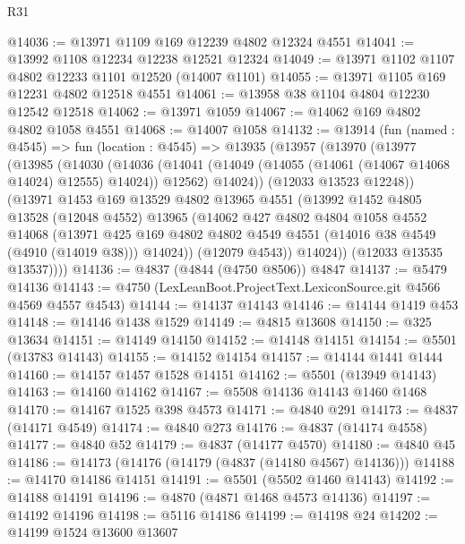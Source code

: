 \begin{lexlean}{R31}
\begin{coremodule}
@14036 := @13971 @1109 @169 @12239 @4802 @12324 @4551
@14041 := @13992 @1108 @12234 @12238 @12521 @12324
@14049 := @13971 @1102 @1107 @4802 @12233 @1101 @12520 (@14007 @1101)
@14055 := @13971 @1105 @169 @12231 @4802 @12518 @4551
@14061 := @13958 @38 @1104 @4804 @12230 @12542 @12518
@14062 := @13971 @1059
@14067 := @14062 @169 @4802 @4802 @1058 @4551
@14068 := @14007 @1058
@14132 := @13914
    (fun (named : @4545) =>
    fun (location : @4545) =>
    @13935
      (@13957
        (@13970
          (@13977
            (@13985
              (@14030
                (@14036
                  (@14041 (@14049 (@14055 (@14061 (@14067 @14068 @14024) @12555) @14024)) @12562)
                  @14024))
              (@12033 @13523 @12248))
            (@13971
              @1453
              @169
              @13529
              @4802
              @13965
              @4551
              (@13992
                @1452
                @4805
                @13528
                (@12048 @4552)
                @13965
                (@14062
                  @427
                  @4802
                  @4804
                  @1058
                  @4552
                  @14068
                  (@13971
                    @425
                    @169
                    @4802
                    @4802
                    @4549
                    @4551
                    (@14016 @38 @4549 (@4910 (@14019 @38)))
                    @14024))
                (@12079 @4543))
              @14024))
          (@12033 @13535 @13537))))
@14136 := @4837 (@4844 (@4750 @8506)) @4847
@14137 := @5479 @14136
@14143 := @4750 (LexLeanBoot.ProjectText.LexiconSource.git @4566 @4569 @4557 @4543)
@14144 := @14137 @14143
@14146 := @14144 @1419 @453
@14148 := @14146 @1438 @1529
@14149 := @4815 @13608
@14150 := @325 @13634
@14151 := @14149 @14150
@14152 := @14148 @14151
@14154 := @5501 (@13783 @14143)
@14155 := @14152 @14154
@14157 := @14144 @1441 @1444
@14160 := @14157 @1457 @1528 @14151
@14162 := @5501 (@13949 @14143)
@14163 := @14160 @14162
@14167 := @5508 @14136 @14143 @1460 @1468
@14170 := @14167 @1525 @398 @4573
@14171 := @4840 @291
@14173 := @4837 (@14171 @4549)
@14174 := @4840 @273
@14176 := @4837 (@14174 @4558)
@14177 := @4840 @52
@14179 := @4837 (@14177 @4570)
@14180 := @4840 @45
@14186 := @14173 (@14176 (@14179 (@4837 (@14180 @4567) @14136)))
@14188 := @14170 @14186 @14151
@14191 := @5501 (@5502 @1460 @14143)
@14192 := @14188 @14191
@14196 := @4870 (@4871 @1468 @4573 @14136)
@14197 := @14192 @14196
@14198 := @5116 @14186
@14199 := @14198 @24
@14202 := @14199 @1524 @13600 @13607

\end{coremodule}
\end{lexlean}
